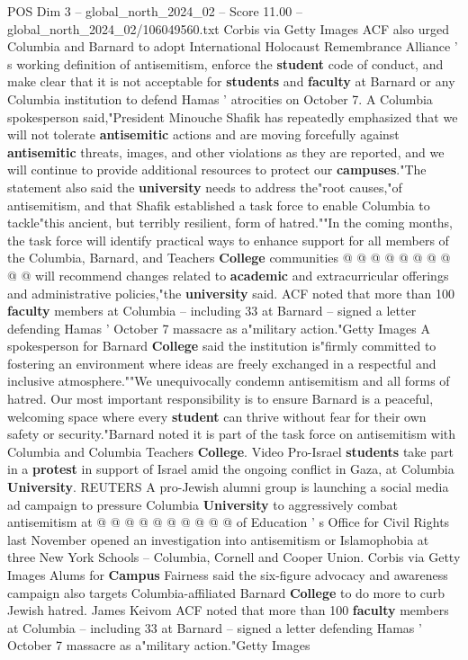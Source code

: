 \begin{textsample}{POS Dim 3 – global\_north\_2024\_02 – Score 11.00 – global\_north\_2024\_02/106049560.txt}
Corbis via Getty Images ACF also urged Columbia and Barnard to adopt International Holocaust Remembrance Alliance ' s working definition of antisemitism, enforce the \textbf{student} code of conduct, and make clear that it is not acceptable for \textbf{students} and \textbf{faculty} at Barnard or any Columbia institution to defend Hamas ' atrocities on October 7.
A Columbia spokesperson said,"President Minouche Shafik has repeatedly emphasized that we will not tolerate \textbf{antisemitic} actions and are moving forcefully against \textbf{antisemitic} threats, images, and other violations as they are reported, and we will continue to provide additional resources to protect our \textbf{campuses}."The statement also said the \textbf{university} needs to address the"root causes,"of antisemitism, and that Shafik established a task force to enable Columbia to tackle"this ancient, but terribly resilient, form of hatred.""In the coming months, the task force will identify practical ways to enhance support for all members of the Columbia, Barnard, and Teachers \textbf{College} communities @ @ @ @ @ @ @ @ @ @ will recommend changes related to \textbf{academic} and extracurricular offerings and administrative policies,"the \textbf{university} said.
ACF noted that more than 100 \textbf{faculty} members at Columbia -- including 33 at Barnard -- signed a letter defending Hamas ' October 7 massacre as a"military action."Getty Images A spokesperson for Barnard \textbf{College} said the institution is"firmly committed to fostering an environment where ideas are freely exchanged in a respectful and inclusive atmosphere.""We unequivocally condemn antisemitism and all forms of hatred.
Our most important responsibility is to ensure Barnard is a peaceful, welcoming space where every \textbf{student} can thrive without fear for their own safety or security."Barnard noted it is part of the task force on antisemitism with Columbia and Columbia Teachers \textbf{College}.
Video Pro-Israel \textbf{students} take part in a \textbf{protest} in support of Israel amid the ongoing conflict in Gaza, at Columbia \textbf{University}.
REUTERS A pro-Jewish alumni group is launching a social media ad campaign to pressure Columbia \textbf{University} to aggressively combat antisemitism at @ @ @ @ @ @ @ @ @ @ of Education ' s Office for Civil Rights last November opened an investigation into antisemitism or Islamophobia at three New York Schools -- Columbia, Cornell and Cooper Union.
Corbis via Getty Images Alums for \textbf{Campus} Fairness said the six-figure advocacy and awareness campaign also targets Columbia-affiliated Barnard \textbf{College} to do more to curb Jewish hatred.
James Keivom ACF noted that more than 100 \textbf{faculty} members at Columbia -- including 33 at Barnard -- signed a letter defending Hamas ' October 7 massacre as a"military action."Getty Images

\end{textsample}
